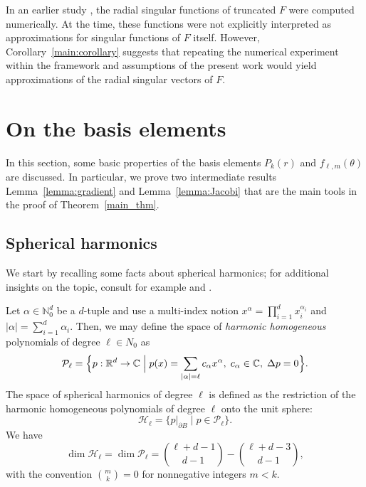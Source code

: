 \documentclass[reqno]{amsart}
\numberwithin{equation}{section}
\numberwithin{figure}{section}
\numberwithin{table}{section}
\theoremstyle{plain}
\theoremstyle{definition}
\theoremstyle{remark}
\newcommand{\abs}[1]{\lvert#1\rvert}
\newcommand{\R}{\mathbb{R}}
\newcommand{\N}{\mathbb{N}}
\newcommand{\C}{\mathbb{C}}
\newcommand{\sphe}{{\partial B}}
\begin{document}
In an earlier study \cite[Section~6.1]{Autio2025}, the radial singular functions of truncated \( F \) were computed numerically.
%
At the time, these functions were not explicitly interpreted as approximations for singular functions of \( F \) itself.
%
However, Corollary~\ref{main:corollary} suggests that repeating the numerical experiment within the framework and assumptions of the present work would yield approximations of the radial singular vectors of \( F \).
%


\section{On the basis elements} \label{sec:basis}


In this section, some basic properties of the basis elements \( P_k(r) \) and \( f_{\ell,m}(\theta) \) are discussed.
%
In particular, we prove two intermediate results Lemma~\ref{lemma:gradient} and Lemma~\ref{lemma:Jacobi} that are the main tools in the proof of Theorem~\ref{main_thm}.
%


\subsection{Spherical harmonics} \label{subsec:sph}


We start by recalling some facts about spherical harmonics; for additional insights on the topic, consult for example \cite[Chapter~5]{Axler_2001} and \cite{Efthimiou_2014}.


%
Let \( \alpha \in \N^d_0 \) be a \( d \)-tuple and use a multi-index notion \( x^\alpha = \prod_{i=1}^d x_i^{\alpha_i} \) and \( \abs{\alpha} = \sum_{i=1}^d \alpha_i \).
%
Then, we may define the space of \emph{harmonic homogeneous} polynomials of degree \( \ell \in N_0 \) as
%
\begin{equation*}
    \mathcal{P}_\ell = \Bigl\{ p : \R^d \to \C  \;\Big|\;  p(x) = \sum_{|\alpha| = \ell} c_\alpha x^\alpha, \; c_\alpha \in \C, \; \Delta p = 0 \Bigr\}.
\end{equation*}
% 
The space of spherical harmonics of degree \( \ell \) is defined as the restriction of the harmonic homogeneous polynomials of degree \( \ell \) onto the unit sphere:
%
\begin{equation*}
    \mathcal{H}_\ell = \{ p|_{\sphe} \mid p \in \mathcal{P}_\ell \}.
\end{equation*}
%
We have 
%
\begin{equation} \label{dimHl}
    \dim\mathcal{H}_\ell = \dim\mathcal{P}_\ell = \binom{\ell+d-1}{d-1} - \binom{\ell+d-3}{d-1},
\end{equation}
%
with the convention \( \binom{m}{k} = 0 \) for nonnegative integers \( m < k \).
%
\end{document}

